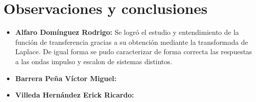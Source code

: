 \section{Observaciones y conclusiones}

\begin{itemize}
	\item \textbf{Alfaro Domínguez Rodrigo:}
	Se logró el estudio y entendimiento de la función de transferencia gracias a su obtención mediante la transformada de Laplace. De igual forma se pudo caracterizar de forma correcta las respuestas a las ondas impulso y escalon de sistemas distintos.
	\item \textbf{Barrera Peña Víctor Miguel:}
	\item \textbf{Villeda Hernández Erick Ricardo:}
\end{itemize}